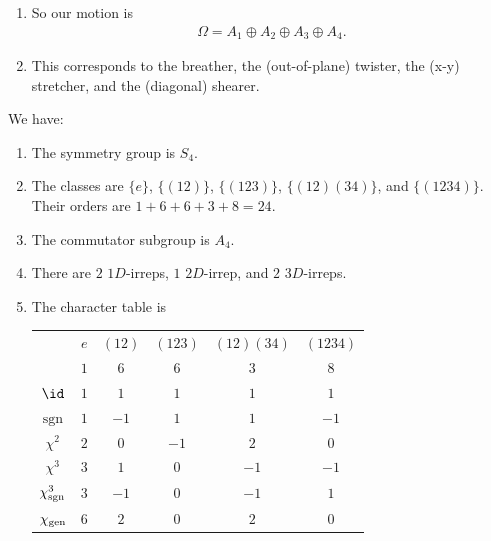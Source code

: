 \documentclass[11pt]{article}
\begin{document}
\begin{eexample}
\begin{enumerate}
\begin{align*}
            (\chi_{\rm gen}, \chi^2) & = \frac{1}{8} (4 + 4) = 1,\\
            (\chi_{\rm gen}, \chi_{2D}) & = \frac{1}{8} (8 - 8) = 0.
        \end{align*}
        \item So our motion is
        \begin{align*}
            \boxed{\Omega = A_1 \oplus A_2 \oplus A_3 \oplus A_4.}
        \end{align*}
        \item This corresponds to the breather, the (out-of-plane) twister, 
        the (x-y) stretcher, and the (diagonal) shearer.
    \end{enumerate}
\end{eexample}

\begin{eexample}
    [Tetrahedron]
    We have:
    \begin{enumerate}
        \item The symmetry group is $S_4$.
        \item The classes are $\{ e \}$, $\{ (12) \}$, $\{ (123) \}$, $\{ (12)(34)\}$, and $\{ (1234) \}$.
        Their orders are $1 + 6 + 6 + 3 + 8 = 24$.
        \item The commutator subgroup is $A_4$.
        \item There are $2$ $1D$-irreps, $1$ $2D$-irrep, and $2$ $3D$-irreps.
        \item The character table is
        \begin{table}[H]
            \centering
            \begin{tabular}{|c|c|c|c|c|c|}
                \hline
                 & $e$ & $(12)$ & $(123)$ & $(12)(34)$ & $(1234)$\\
                 & $1$ & $6$ & $6$ & $3$ & $8$\\
                \hline
                $\id$ & $1$ & $1$ & $1$ & $1$ & $1$\\
                $\operatorname{sgn}$ & $1$ & $-1$ & $1$ & $1$ & $-1$\\
                $\chi^2$ & $2$ & $0$ & $-1$ & $2$ & $0$\\
                $\chi^3$ & $3$ & $1$ & $0$ & $-1$ & $-1$\\    
                $\chi^3_{\rm sgn}$ & $3$ & $-1$ & $0$ & $-1$ & $1$\\
                $\chi_{\rm gen}$ & $6$ & $2$ & $0$ & $2$ & $0$\\
                \hline

\end{tabular}
\end{table}
\end{enumerate}
\end{eexample}
\end{document}
